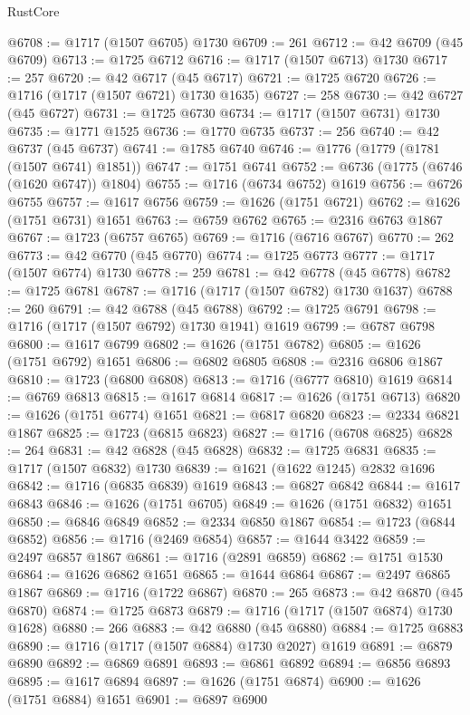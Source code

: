 \begin{lexlean}{RustCore}
\begin{coremodule}
@6708 := @1717 (@1507 @6705) @1730
@6709 := 261
@6712 := @42 @6709 (@45 @6709)
@6713 := @1725 @6712
@6716 := @1717 (@1507 @6713) @1730
@6717 := 257
@6720 := @42 @6717 (@45 @6717)
@6721 := @1725 @6720
@6726 := @1716 (@1717 (@1507 @6721) @1730 @1635)
@6727 := 258
@6730 := @42 @6727 (@45 @6727)
@6731 := @1725 @6730
@6734 := @1717 (@1507 @6731) @1730
@6735 := @1771 @1525
@6736 := @1770 @6735
@6737 := 256
@6740 := @42 @6737 (@45 @6737)
@6741 := @1785 @6740
@6746 := @1776 (@1779 (@1781 (@1507 @6741) @1851))
@6747 := @1751 @6741
@6752 := @6736 (@1775 (@6746 (@1620 @6747)) @1804)
@6755 := @1716 (@6734 @6752) @1619
@6756 := @6726 @6755
@6757 := @1617 @6756
@6759 := @1626 (@1751 @6721)
@6762 := @1626 (@1751 @6731) @1651
@6763 := @6759 @6762
@6765 := @2316 @6763 @1867
@6767 := @1723 (@6757 @6765)
@6769 := @1716 (@6716 @6767)
@6770 := 262
@6773 := @42 @6770 (@45 @6770)
@6774 := @1725 @6773
@6777 := @1717 (@1507 @6774) @1730
@6778 := 259
@6781 := @42 @6778 (@45 @6778)
@6782 := @1725 @6781
@6787 := @1716 (@1717 (@1507 @6782) @1730 @1637)
@6788 := 260
@6791 := @42 @6788 (@45 @6788)
@6792 := @1725 @6791
@6798 := @1716 (@1717 (@1507 @6792) @1730 @1941) @1619
@6799 := @6787 @6798
@6800 := @1617 @6799
@6802 := @1626 (@1751 @6782)
@6805 := @1626 (@1751 @6792) @1651
@6806 := @6802 @6805
@6808 := @2316 @6806 @1867
@6810 := @1723 (@6800 @6808)
@6813 := @1716 (@6777 @6810) @1619
@6814 := @6769 @6813
@6815 := @1617 @6814
@6817 := @1626 (@1751 @6713)
@6820 := @1626 (@1751 @6774) @1651
@6821 := @6817 @6820
@6823 := @2334 @6821 @1867
@6825 := @1723 (@6815 @6823)
@6827 := @1716 (@6708 @6825)
@6828 := 264
@6831 := @42 @6828 (@45 @6828)
@6832 := @1725 @6831
@6835 := @1717 (@1507 @6832) @1730
@6839 := @1621 (@1622 @1245) @2832 @1696
@6842 := @1716 (@6835 @6839) @1619
@6843 := @6827 @6842
@6844 := @1617 @6843
@6846 := @1626 (@1751 @6705)
@6849 := @1626 (@1751 @6832) @1651
@6850 := @6846 @6849
@6852 := @2334 @6850 @1867
@6854 := @1723 (@6844 @6852)
@6856 := @1716 (@2469 @6854)
@6857 := @1644 @3422
@6859 := @2497 @6857 @1867
@6861 := @1716 (@2891 @6859)
@6862 := @1751 @1530
@6864 := @1626 @6862 @1651
@6865 := @1644 @6864
@6867 := @2497 @6865 @1867
@6869 := @1716 (@1722 @6867)
@6870 := 265
@6873 := @42 @6870 (@45 @6870)
@6874 := @1725 @6873
@6879 := @1716 (@1717 (@1507 @6874) @1730 @1628)
@6880 := 266
@6883 := @42 @6880 (@45 @6880)
@6884 := @1725 @6883
@6890 := @1716 (@1717 (@1507 @6884) @1730 @2027) @1619
@6891 := @6879 @6890
@6892 := @6869 @6891
@6893 := @6861 @6892
@6894 := @6856 @6893
@6895 := @1617 @6894
@6897 := @1626 (@1751 @6874)
@6900 := @1626 (@1751 @6884) @1651
@6901 := @6897 @6900

\end{coremodule}
\end{lexlean}

